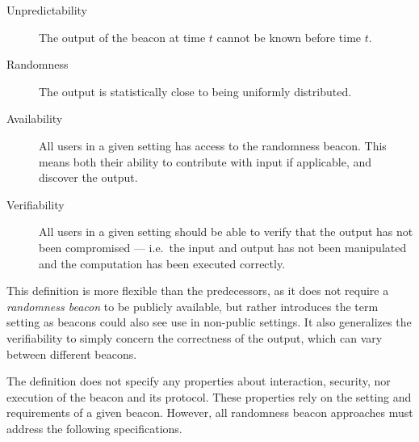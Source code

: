 \begin{description}
    \item[Unpredictability] The output of the beacon at time $t$ cannot be known before time $t$.
    \item[Randomness] The output is statistically close to being uniformly distributed.
    \item[Availability] All users in a given setting has access to the randomness beacon.
       This means both their ability to contribute with input if applicable, and discover the output.
    \item[Verifiability] All users in a given setting should be able to verify that the output has not been compromised --- i.e.\ the input and output has not been manipulated and the computation has been executed correctly.
\end{description}

This definition is more flexible than the predecessors, as it does not require a \emph{randomness beacon} to be publicly available, but rather introduces the term setting as beacons could also see use in non-public settings.
It also generalizes the verifiability to simply concern the correctness of the output, which can vary between different beacons.

The definition does not specify any properties about interaction, security, nor execution of the beacon and its protocol.
These properties rely on the setting and requirements of a given beacon.
However, all randomness beacon approaches must address the following specifications.
